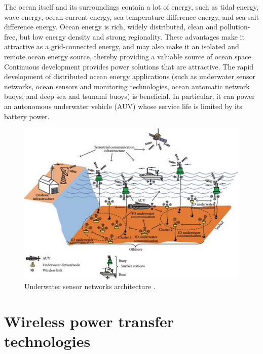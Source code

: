 The ocean itself and its surroundings contain a lot of energy, such as tidal energy, wave energy, ocean current energy, sea temperature difference energy, and sea salt difference energy. Ocean energy is rich, widely distributed, clean and pollution-free, but low energy density and strong regionality. These advantages make it attractive as a grid-connected energy, and may also make it an isolated and remote ocean energy source, thereby providing a valuable source of ocean space. Continuous development provides power solutions that are attractive. The rapid development of distributed ocean energy applications (such as underwater sensor networks, ocean sensors and monitoring technologies, ocean automatic network buoys, and deep sea and tsunami buoys) is beneficial. In particular, it can power an autonomous underwater vehicle (AUV) whose service life is limited by its battery power.

\begin{figure}[htbp]
    \centering
    \includegraphics[width=0.7\linewidth]{images/1_underwater_sensor_networks.png}
    \caption{Underwater sensor networks architecture \cite{Nayyar}.}
\end{figure}



\section{Wireless power transfer technologies}

